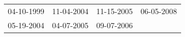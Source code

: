 \begin{supertabular}{llll}
 04-10-1999 &  11-04-2004 &  11-15-2005 &  06-05-2008 \\
 05-19-2004 &  04-07-2005 &  09-07-2006 &             \\
\end{supertabular}
